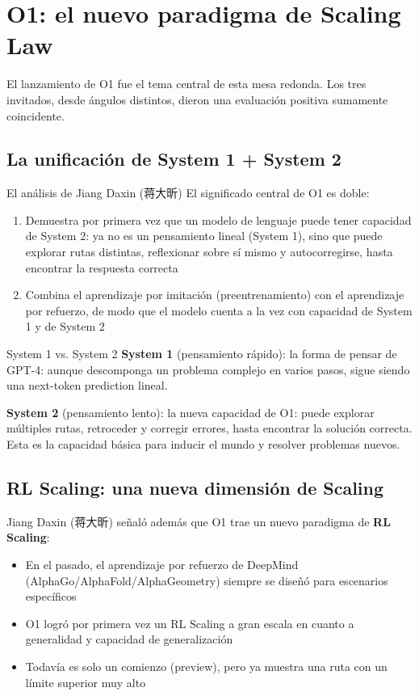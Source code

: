 \section{O1: el nuevo paradigma de Scaling Law}

El lanzamiento de O1 fue el tema central de esta mesa redonda. Los tres invitados, desde ángulos distintos, dieron una evaluación positiva sumamente coincidente.

\subsection{La unificación de System 1 + System 2}

\begin{importantbox}{El análisis de Jiang Daxin (蒋大昕)}
El significado central de O1 es doble:
\begin{enumerate}
\item Demuestra por primera vez que un modelo de lenguaje puede tener capacidad de System 2: ya no es un pensamiento lineal (System 1), sino que puede explorar rutas distintas, reflexionar sobre sí mismo y autocorregirse, hasta encontrar la respuesta correcta
\item Combina el aprendizaje por imitación (preentrenamiento) con el aprendizaje por refuerzo, de modo que el modelo cuenta a la vez con capacidad de System 1 y de System 2
\end{enumerate}
\end{importantbox}

\begin{knowledgebox}{System 1 vs. System 2}
\textbf{System 1} (pensamiento rápido): la forma de pensar de GPT-4: aunque descomponga un problema complejo en varios pasos, sigue siendo una next-token prediction lineal.

\textbf{System 2} (pensamiento lento): la nueva capacidad de O1: puede explorar múltiples rutas, retroceder y corregir errores, hasta encontrar la solución correcta. Esta es la capacidad básica para inducir el mundo y resolver problemas nuevos.
\end{knowledgebox}

\subsection{RL Scaling: una nueva dimensión de Scaling}

Jiang Daxin (蒋大昕) señaló además que O1 trae un nuevo paradigma de \textbf{RL Scaling}:

\begin{itemize}
\item En el pasado, el aprendizaje por refuerzo de DeepMind (AlphaGo/AlphaFold/AlphaGeometry) siempre se diseñó para escenarios específicos
\item O1 logró por primera vez un RL Scaling a gran escala en cuanto a generalidad y capacidad de generalización
\item Todavía es solo un comienzo (preview), pero ya muestra una ruta con un límite superior muy alto
\end{itemize}

